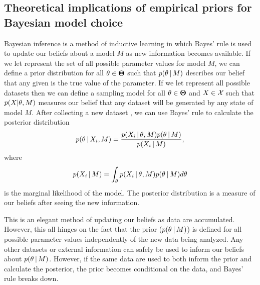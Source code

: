 \documentclass[letterpaper,12pt]{article}
\begin{document}
\begin{linenumbers}
\subsection*{Theoretical implications of empirical priors for Bayesian model
choice}
\begin{linenomath}
Bayesian inference is a method of inductive learning in which Bayes' rule is
used to update our beliefs about a model $M$ as new information becomes
available.
If we let \allParameterValues represent the set of all possible parameter
values for model $M$, we can define a prior distribution for all $\theta \in
\boldsymbol{\Theta}$ such that $p(\theta \,|\, M)$ describes our belief that
any given \myTheta{} is the true value of the parameter.
If we let \allDatasets represent all possible datasets then we can 
define a sampling model for all $\theta \in
\boldsymbol{\Theta}$ and $\alignment{}{} \in \allDatasets$ such that
$p(\alignment{}{} | \theta, M)$ measures our belief that any dataset \alignment{}{}
will be generated by any state \myTheta{} of model $M$.
After collecting a new dataset , we can use Bayes' rule to
calculate the posterior distribution
\begin{equation}
    p(\myTheta{} \given \alignment{i}{}, M) = \frac{p(\alignment{i}{} \given
    \myTheta{}, M)p(\myTheta{} \given M)}{p(\alignment{i}{} \given M)},
    \label{eq:bayesrule}
\end{equation}
where
\begin{equation}
    p(\alignment{i}{} \given M) = \int_{\myTheta{}} p(\alignment{i}{} \given
    \myTheta{}, M)p(\myTheta{} \given M) d\myTheta{}
    \label{eq:marginallikelhiood}
\end{equation}
is the marginal likelihood of the model.
The posterior distribution is a measure of our beliefs after seeing the new
information.
\end{linenomath}

This is an elegant method of updating our beliefs as data are accumulated.
However, this all hinges on the fact that the prior ($p(\theta_{} \,|\, M)$)
is defined for all possible parameter values independently of the new data
being analyzed.
Any other datasets or external information can safely be used to inform our
beliefs about $p(\theta_{} \,|\, M)$.
However, if the same data are used to both inform the prior and calculate the
posterior, the prior becomes conditional on the data, and Bayes' rule breaks
down.


\end{linenumbers}
\end{document}
